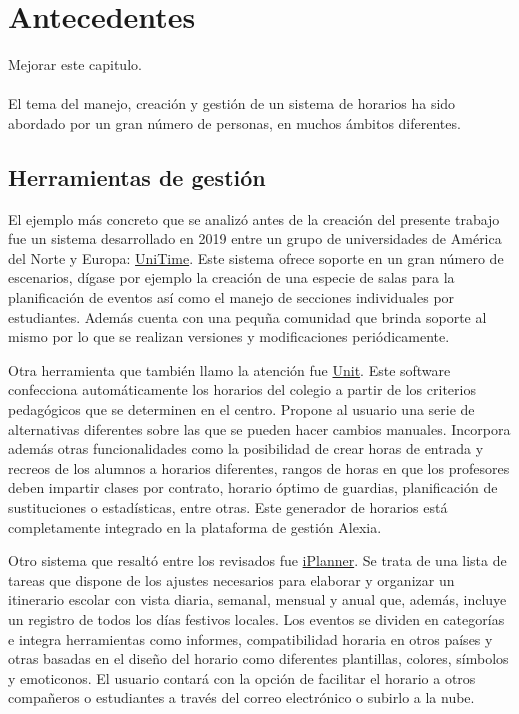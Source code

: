 \chapter{Antecedentes}\label{chapter:state_of_the_art} 

Mejorar este capitulo. \\\\ 

El tema del manejo, creación y gestión de un sistema de horarios ha sido abordado por un gran número de personas, en muchos ámbitos diferentes.

\section{Herramientas de gestión}
El ejemplo más concreto que se analizó antes de la creación del presente trabajo fue un sistema desarrollado en 2019 entre un grupo de universidades de América del Norte y Europa: \href{https://www.unitime.org/}{UniTime}. Este sistema ofrece soporte en un gran número de escenarios, dígase por ejemplo la creación de una especie de salas para la planificación de eventos así como el manejo de secciones individuales por estudiantes. Además cuenta con una pequña comunidad que brinda soporte al mismo por lo que se realizan versiones y modificaciones periódicamente.

Otra herramienta que también llamo la atención fue \href{http://www.educaria.es/#horarios2}{Unit}. Este software confecciona automáticamente los horarios del colegio a partir de los criterios pedagógicos que se determinen en el centro. Propone al usuario una serie de alternativas diferentes sobre las que se pueden hacer cambios manuales. Incorpora además otras funcionalidades como la posibilidad de crear horas de entrada y recreos de los alumnos a horarios diferentes, rangos de horas en que los profesores deben impartir clases por contrato, horario óptimo de guardias, planificación de sustituciones o estadísticas, entre otras. Este generador de horarios está completamente integrado en la plataforma de gestión Alexia.

Otro sistema que resaltó entre los revisados fue \href{http://www.iplannerapp.com/}{iPlanner}. Se trata de una lista de tareas que dispone de los ajustes necesarios para elaborar y organizar un itinerario escolar con vista diaria, semanal, mensual y anual que, además, incluye un registro de todos los días festivos locales. Los eventos se dividen en categorías e integra herramientas como informes, compatibilidad horaria en otros países y otras basadas en el diseño del horario como diferentes plantillas, colores, símbolos y emoticonos. El usuario contará con la opción de facilitar el horario a otros compañeros o estudiantes a través del correo electrónico o subirlo a la nube. 

